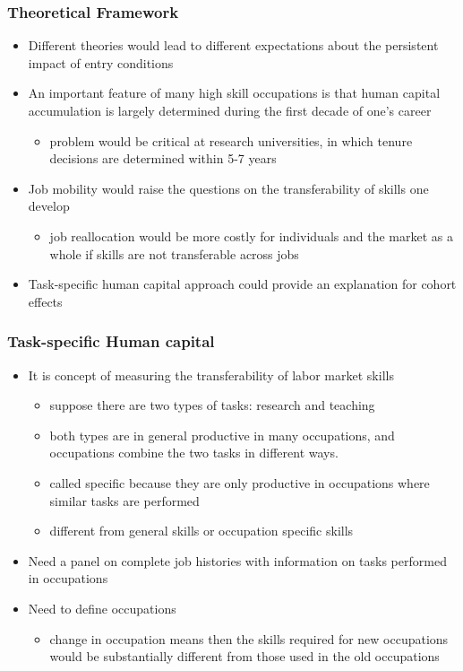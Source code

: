 \documentclass[11pt]{beamer}
\begin{document}
\begin{frame}
	\frametitle{Theoretical Framework}
	\begin{itemize}
		\item Different theories would lead to different expectations about the persistent impact of entry conditions
		\item An important feature of many high skill occupations is that human capital accumulation is largely determined during the first decade of one’s career
		\begin{itemize}
			\item problem would be critical at research universities, in which tenure decisions are determined within 5-7 years
		\end{itemize}
		\item Job mobility would raise the questions on the transferability of skills one develop
		\begin{itemize}
			\item job reallocation would be more costly for individuals and the market as a whole if skills are not transferable across jobs
		\end{itemize}
		\item Task-specific human capital approach could provide an explanation for cohort effects %
	\end{itemize}
\end{frame}


\begin{frame}
	\frametitle{Task-specific Human capital}
	\begin{itemize}
		\item It is concept of measuring the transferability of labor market skills
		\begin{itemize}
		\item suppose there are two types of tasks: research and teaching
		\item both types are in general productive in many occupations, and occupations combine the two tasks in different ways.
		\item called specific because they are only productive in occupations where similar tasks are performed
		\item different from general skills or occupation specific skills
		\end{itemize}
		\item Need a panel on complete job histories with information on tasks performed in occupations
		\item Need to define occupations
		\begin{itemize}
			\item change in occupation means then the skills required for new occupations would be substantially different from those used in the old occupations 
		\end{itemize}
	\end{itemize}
\end{frame}
\end{document}
